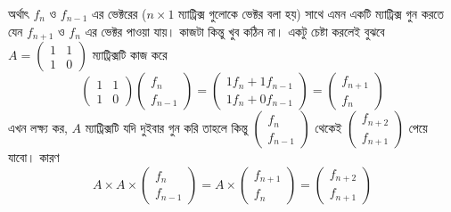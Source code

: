 অর্থাৎ $f_{n}$ ও $f_{n - 1}$ এর ভেক্টরের ($n \times 1$ ম্যাট্রিক্স গুলোকে ভেক্টর বলা হয়) সাথে এমন একটি ম্যাট্রিক্স গুন করতে যেন $f_{n + 1}$ ও $f_{n}$ এর ভেক্টর পাওয়া যায়। কাজটা কিন্তু খুব কঠিন না। একটু চেষ্টা করলেই বুঝবে $A = \begin{pmatrix}
  1 & 1\\ 
  1 & 0
\end{pmatrix}$  ম্যাট্রিক্সটি কাজ 
করে 
$$
\begin{pmatrix}
1 & 1 \\
1 & 0
\end{pmatrix} 
\begin{pmatrix}
f_{n} \\
f_{n - 1}
\end{pmatrix}
= 
\begin{pmatrix}
1f_{n} + 1f_{n - 1} \\
1f_{n} + 0f_{n - 1}
\end{pmatrix}
=
\begin{pmatrix}
f_{n + 1} \\
f_{n}
\end{pmatrix}
$$ 
এখন লক্ষ্য কর, $A$ ম্যাট্রিক্সটি যদি দুইবার গুন করি তাহলে কিন্তু $\begin{pmatrix}
  f_n\\ 
  f_{n - 1}
\end{pmatrix}$ থেকেই $\begin{pmatrix}
  f_{n + 2}\\ 
  f_{n + 1}
\end{pmatrix}$ পেয়ে যাবো।  কারণ 
$$
A \times A \times
\begin{pmatrix}
f_{n} \\
f_{n - 1}
\end{pmatrix}
= 
A \times
\begin{pmatrix}
f_{n + 1} \\
f_{n}
\end{pmatrix}
=
\begin{pmatrix}
f_{n + 2} \\
f_{n + 1}
\end{pmatrix}
$$ 

